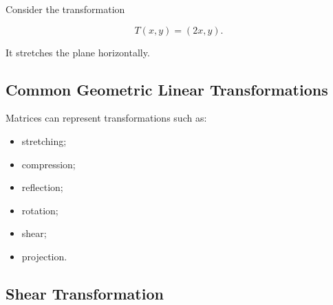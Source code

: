Consider the transformation

\[ T(x,y)=(2x,y). \]

It stretches the plane horizontally.

\begin{center}
\begin{minipage}{0.44\textwidth}
\centering
{}
\end{minipage}
\hfill
\begin{minipage}{0.44\textwidth}
\centering
{}
\end{minipage}
\end{center}

\subsection{Common Geometric Linear Transformations}
\label{subsec:common-transformations}

Matrices can represent transformations such as:

\begin{itemize}
    \item stretching;
    \item compression;
    \item reflection;
    \item rotation;
    \item shear;
    \item projection.
\end{itemize}

\subsection{Shear Transformation}
\label{subsec:shear-transformation}

